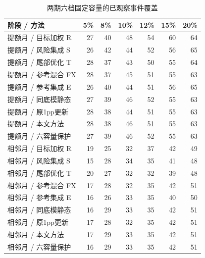 \begin{table}[H]\centering\caption{两期六档固定容量的已观察事件覆盖}
\fontsize{9bp}{12bp}\selectfont
\begin{tabularx}{\linewidth}{@{}Yrrrrrr@{}}\toprule
阶段 / 方法 & 5\% & 8\% & 10\% & 12\% & 15\% & 20\%\\\midrule
提额月 / 目标加权 R & 27 & 40 & 48 & 54 & 60 & 64\\
提额月 / 风险集成 S & 26 & 42 & 44 & 52 & 56 & 65\\
提额月 / 尾部优化 T & 28 & 37 & 43 & 50 & 55 & 64\\
提额月 / 参考混合 FX & 28 & 37 & 45 & 51 & 55 & 63\\
提额月 / 参考集成 E & 26 & 40 & 44 & 51 & 56 & 65\\
提额月 / 同底模静态 & 27 & 39 & 46 & 52 & 55 & 63\\
提额月 / 原1pp更新 & 28 & 38 & 44 & 51 & 55 & 63\\
提额月 / 本文方法 & 28 & 38 & 46 & 51 & 55 & 63\\
提额月 / 六容量保护 & 27 & 39 & 46 & 52 & 55 & 63\\
相邻月 / 目标加权 R & 19 & 25 & 32 & 37 & 42 & 49\\
相邻月 / 风险集成 S & 15 & 28 & 34 & 35 & 41 & 48\\
相邻月 / 尾部优化 T & 20 & 27 & 32 & 32 & 39 & 48\\
相邻月 / 参考混合 FX & 17 & 28 & 32 & 35 & 42 & 51\\
相邻月 / 参考集成 E & 16 & 26 & 33 & 35 & 40 & 50\\
相邻月 / 同底模静态 & 16 & 29 & 33 & 35 & 42 & 51\\
相邻月 / 原1pp更新 & 17 & 28 & 32 & 35 & 42 & 51\\
相邻月 / 本文方法 & 17 & 29 & 33 & 35 & 42 & 51\\
相邻月 / 六容量保护 & 16 & 29 & 33 & 35 & 42 & 51\\
\bottomrule\end{tabularx}
\end{table}